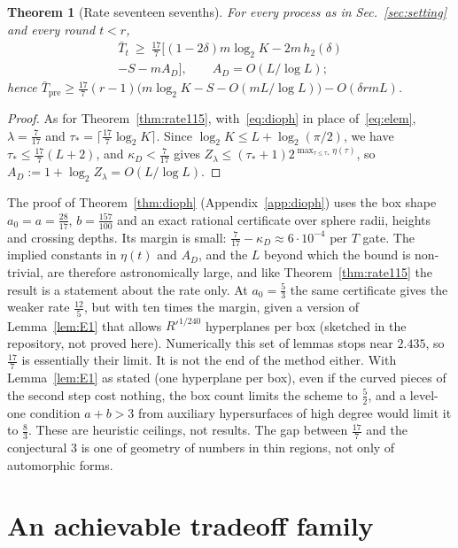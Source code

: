 \documentclass[aps,prx,twocolumn,superscriptaddress,nofootinbib,longbibliography]{revtex4-2}
\theoremstyle{plain}
\newtheorem{theorem}{Theorem}
\theoremstyle{definition}
\theoremstyle{remark}
\newcommand{\Tpre}{T_{\mathrm{pre}}}
\begin{document}
\begin{theorem}[Rate seventeen sevenths]\label{thm:rate177}
For every process as in Sec.~\ref{sec:setting} and every round $t<r$,
\begin{multline}\label{eq:rate177}
\bar T_t\ \ge\ \tfrac{17}7\big[(1-2\delta)m\log_2K-2m\,h_2(\delta)\\-S-mA_D\big],\qquad A_D=O(L/\log L);
\end{multline}
hence $\bar\Tpre\ge\tfrac{17}7(r-1)\big(m\log_2K-S-O(mL/\log L)\big)-O(\delta rmL)$.
\end{theorem}
\begin{proof}
As for Theorem~\ref{thm:rate115}, with~\eqref{eq:dioph} in place of~\eqref{eq:elem}, $\lambda=\tfrac7{17}$ and $\tau_*=\lceil\tfrac{17}7\log_2K\rceil$. Since $\log_2K\le L+\log_2(\pi/2)$, we have $\tau_*\le\tfrac{17}7(L+2)$, and $\kappa_D<\tfrac7{17}$ gives $Z_\lambda\le(\tau_*+1)2^{\max_{\tau\le\tau_*}\eta(\tau)}$, so $A_D:=1+\log_2Z_\lambda=O(L/\log L)$.
\end{proof}
The proof of Theorem~\ref{thm:dioph} (Appendix~\ref{app:dioph}) uses the box shape $a_0=a=\tfrac{28}{17}$, $b=\tfrac{157}{100}$ and an exact rational certificate over sphere radii, heights and crossing depths. Its margin is small: $\tfrac7{17}-\kappa_D\approx6\cdot10^{-4}$ per $T$ gate. The implied constants in $\eta(t)$ and $A_D$, and the $L$ beyond which the bound is non-trivial, are therefore astronomically large, and like Theorem~\ref{thm:rate115} the result is a statement about the rate only. At $a_0=\tfrac53$ the same certificate gives the weaker rate $\tfrac{12}5$, but with ten times the margin, given a version of Lemma~\ref{lem:E1} that allows $R'^{1/240}$ hyperplanes per box (sketched in the repository, not proved here). Numerically this set of lemmas stops near $2.435$, so $\tfrac{17}7$ is essentially their limit. It is not the end of the method either. With Lemma~\ref{lem:E1} as stated (one hyperplane per box), even if the curved pieces of the second step cost nothing, the box count limits the scheme to $\tfrac52$, and a level-one condition $a+b>3$ from auxiliary hypersurfaces of high degree would limit it to $\tfrac83$. These are heuristic ceilings, not results. The gap between $\tfrac{17}7$ and the conjectural $3$ is one of geometry of numbers in thin regions, not only of automorphic forms.
\section{An achievable tradeoff family}\label{sec:frontier}
\end{document}
